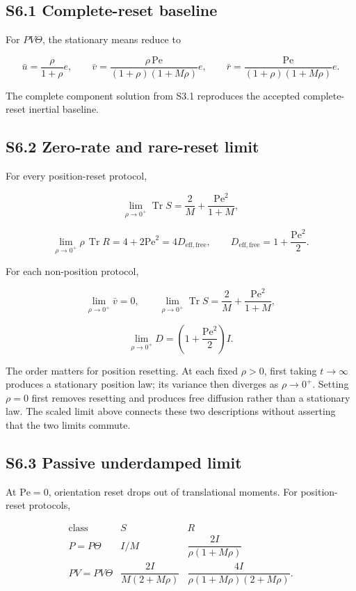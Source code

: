 \subsection{S6.1 Complete-reset baseline}\label{s6.1-complete-reset-baseline}

For \(PV\Theta\), the stationary means reduce to

\[
\bar u=\frac{\rho}{1+\rho}e,\qquad
\bar v=\frac{\rho\,\mathrm{Pe}}
{(1+\rho)(1+M\rho)}e,\qquad
\bar r=\frac{\mathrm{Pe}}
{(1+\rho)(1+M\rho)}e.
\]

The complete component solution from S3.1 reproduces the accepted complete-reset inertial baseline.

\subsection{S6.2 Zero-rate and rare-reset limit}\label{s6.2-zero-rate-and-rare-reset-limit}

For every position-reset protocol,

\[
\lim_{\rho\to0^+}\operatorname{Tr}S
=\frac{2}{M}+\frac{\mathrm{Pe}^2}{1+M},
\]

\[
\lim_{\rho\to0^+}\rho\,\operatorname{Tr}R
=4+2\mathrm{Pe}^2
=4D_{\mathrm{eff,free}},
\qquad
D_{\mathrm{eff,free}}=1+\frac{\mathrm{Pe}^2}{2}.
\]

For each non-position protocol,

\[
\lim_{\rho\to0^+}\bar v=0,\qquad
\lim_{\rho\to0^+}\operatorname{Tr}S
=\frac{2}{M}+\frac{\mathrm{Pe}^2}{1+M},
\]

\[
\lim_{\rho\to0^+}D
=\left(1+\frac{\mathrm{Pe}^2}{2}\right)I.
\]

The order matters for position resetting. At each fixed \(\rho>0\), first taking \(t\to\infty\) produces a stationary position law; its variance then diverges as \(\rho\to0^+\). Setting \(\rho=0\) first removes resetting and produces free diffusion rather than a stationary law. The scaled limit above connects these two descriptions without asserting that the two limits commute.

\subsection{S6.3 Passive underdamped limit}\label{s6.3-passive-underdamped-limit}

At \(\mathrm{Pe}=0\), orientation reset drops out of translational moments. For position-reset protocols,

\[
\begin{array}{c|cc}
\text{class} & S & R\\ \hline
P=P\Theta
& I/M
& \dfrac{2I}{\rho(1+M\rho)}\\[3mm]
PV=PV\Theta
& \dfrac{2I}{M(2+M\rho)}
& \dfrac{4I}{\rho(1+M\rho)(2+M\rho)}.
\end{array}
\]

